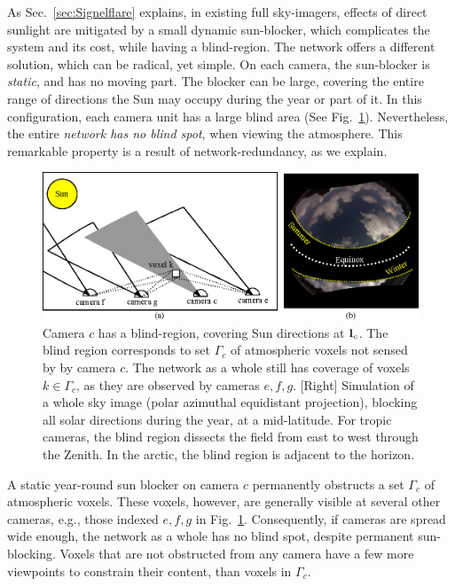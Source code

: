 \documentclass[runningheads]{llncs}
\begin{document}
As Sec.~\ref{sec:Signelflare} explains, in existing full sky-imagers, effects of direct sunlight are mitigated by a small dynamic sun-blocker, which complicates the system and its cost, while having a blind-region. The network offers a different solution, which can be radical, yet simple. On each camera, the sun-blocker is {\em static}, and has no moving part. The blocker can be large, covering the entire range of directions the Sun may occupy during the year or part of it. In this configuration, each camera unit has a large blind area (See Fig.~\ref{fig:blindspot}). Nevertheless, the entire {\em network has no blind spot}, when viewing the atmosphere. This remarkable property is a result of network-redundancy, as we explain.
\begin{figure}[t!]
\begin{center}
   \includegraphics[width=0.8\linewidth]{figures/sun_blocks.eps}
\end{center}
   \vspace{-0.6cm}
   \caption{Camera $c$ has a blind-region, covering Sun directions at ${\bf l}_c$. The blind region corresponds to set $\Gamma_c$ of atmospheric voxels not sensed by by camera $c$. The network as a whole still has coverage of voxels $k\in\Gamma_c$, as they are observed by cameras $e,f,g$.
   [Right] Simulation of a whole sky image (polar azimuthal equidistant projection), blocking
   all solar directions during the year, at a mid-latitude. For tropic cameras, the blind region dissects the field from east to west through the Zenith. In the arctic, the blind region is adjacent to the horizon.
   }
\label{fig:blindspot}
\end{figure}


A static year-round sun blocker on camera $c$ permanently obstructs a set $\Gamma_c$ of atmospheric voxels. These voxels, however, are generally visible at several other cameras, e.g., those indexed $e,f,g$ in Fig.~\ref{fig:blindspot}. Consequently, if cameras are spread wide enough, the network as a whole has no blind spot, despite permanent sun-blocking. Voxels that are not obstructed from any camera have a few more viewpoints to constrain their content, than voxels in $\Gamma_c$.
\end{document}
